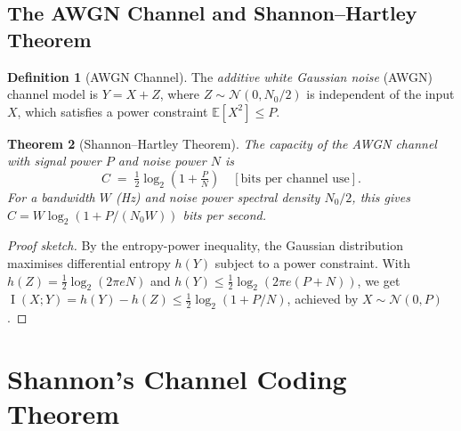 \documentclass[12pt,a4paper]{amsart}
\newtheorem{theorem}{Theorem}[section]
\theoremstyle{definition}
\newtheorem{definition}[theorem]{Definition}
\theoremstyle{remark}
\DeclareMathOperator{\MI}{I}
\newcommand{\E}{\mathbb{E}}
\begin{document}
\subsection{The AWGN Channel and Shannon--Hartley Theorem}

\begin{definition}[AWGN Channel]
The \emph{additive white Gaussian noise} (AWGN) channel model is
$Y = X + Z$, where $Z \sim \mathcal{N}(0, N_0/2)$ is independent of the input
$X$, which satisfies a power constraint $\E[X^2] \leq P$.
\end{definition}

\begin{theorem}[Shannon--Hartley Theorem]\label{thm:shannon-hartley}
The capacity of the AWGN channel with signal power $P$ and noise power $N$ is
\begin{equation}\label{eq:awgn}
  C \;=\; \tfrac{1}{2}\log_2\!\left(1 + \tfrac{P}{N}\right)
  \quad [\text{bits per channel use}].
\end{equation}
For a bandwidth $W$ (Hz) and noise power spectral density $N_0/2$, this gives
$C = W \log_2(1 + P/(N_0 W))$ bits per second.
\end{theorem}
\begin{proof}[Proof sketch]
By the entropy-power inequality, the Gaussian distribution maximises differential
entropy $h(Y)$ subject to a power constraint. With $h(Z) = \frac{1}{2}\log_2(2\pi
e N)$ and $h(Y) \leq \frac{1}{2}\log_2(2\pi e(P+N))$, we get $\MI(X;Y) = h(Y) -
h(Z) \leq \frac{1}{2}\log_2(1+P/N)$, achieved by $X \sim \mathcal{N}(0,P)$.
\end{proof}

\section{Shannon's Channel Coding Theorem}
\end{document}
